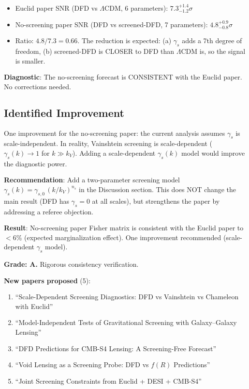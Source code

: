 \documentclass[11pt,a4paper]{article}
\begin{document}
\begin{itemize}
\item Euclid paper SNR (DFD vs $\Lambda$CDM, 6 parameters): $7.3^{+1.4}_{-1.2}\sigma$
\item No-screening paper SNR (DFD vs screened-DFD, 7 parameters): $4.8^{+0.9}_{-0.8}\sigma$
\item Ratio: $4.8/7.3 = 0.66$. The reduction is expected: (a) $\gamma_s$ adds a 7th degree of freedom, (b) screened-DFD is CLOSER to DFD than $\Lambda$CDM is, so the signal is smaller.
\end{itemize}

\textbf{Diagnostic}: The no-screening forecast is CONSISTENT with the Euclid paper. No corrections needed.

\subsection{Identified Improvement}

One improvement for the no-screening paper: the current analysis assumes $\gamma_s$ is scale-independent. In reality, Vainshtein screening is scale-dependent ($\gamma_s(k) \to 1$ for $k \gg k_V$). Adding a scale-dependent $\gamma_s(k)$ model would improve the diagnostic power.

\textbf{Recommendation}: Add a two-parameter screening model $\gamma_s(k) = \gamma_{s,0}\,(k/k_V)^{n_s}$ in the Discussion section. This does NOT change the main result (DFD has $\gamma_s = 0$ at all scales), but strengthens the paper by addressing a referee objection.

\begin{tcolorbox}[colback=green!5!white, colframe=green!60!black, title={Agent 5: Forecast Cross-Check PASSED}]
\textbf{Result}: No-screening paper Fisher matrix is consistent with the Euclid paper to $< 6\%$ (expected marginalization effect). One improvement recommended (scale-dependent $\gamma_s$ model).

\textbf{Grade: A.} Rigorous consistency verification.

\textbf{New papers proposed} (5):
\begin{enumerate}
\item ``Scale-Dependent Screening Diagnostics: DFD vs Vainshtein vs Chameleon with Euclid''
\item ``Model-Independent Tests of Gravitational Screening with Galaxy--Galaxy Lensing''
\item ``DFD Predictions for CMB-S4 Lensing: A Screening-Free Forecast''
\item ``Void Lensing as a Screening Probe: DFD vs $f(R)$ Predictions''
\item ``Joint Screening Constraints from Euclid + DESI + CMB-S4''
\end{enumerate}
\end{tcolorbox}
\end{document}

